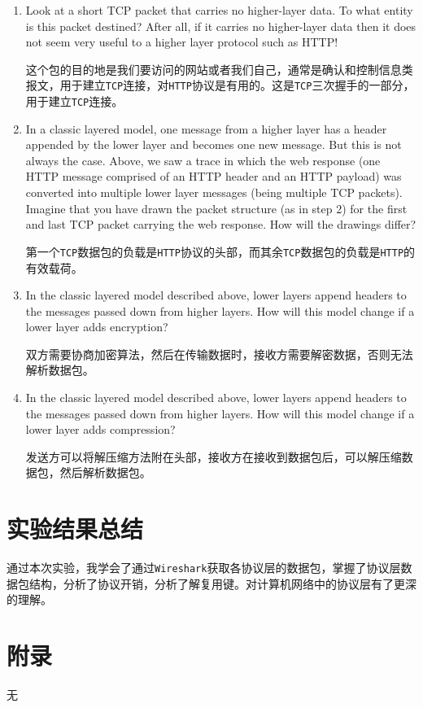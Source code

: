 \documentclass{article}
\begin{document}
\begin{enumerate}[noitemsep]
  \item Look at a short TCP packet that carries no higher-layer data. To what entity is this packet destined? After all, if it carries no higher-layer data then it does not seem very useful to a higher layer protocol such as HTTP!

        这个包的目的地是我们要访问的网站或者我们自己，通常是确认和控制信息类报文，用于建立\texttt{TCP}连接，对\texttt{HTTP}协议是有用的。这是\texttt{TCP}三次握手的一部分，用于建立\texttt{TCP}连接。

  \item In a classic layered model, one message from a higher layer has a header appended by the lower layer and becomes one new message. But this is not always the case. Above, we saw a trace in which the web response (one HTTP message comprised of an HTTP header and an HTTP payload) was converted into multiple lower layer messages (being multiple TCP packets).  Imagine that you have drawn the packet structure (as in step 2) for the first and last TCP packet carrying the web response.  How will the drawings differ?

        第一个\texttt{TCP}数据包的负载是\texttt{HTTP}协议的头部，而其余\texttt{TCP}数据包的负载是\texttt{HTTP}的有效载荷。


  \item In the classic layered model described above, lower layers append headers to the messages passed down from higher layers. How will this model change if a lower layer adds encryption?

        双方需要协商加密算法，然后在传输数据时，接收方需要解密数据，否则无法解析数据包。

  \item In the classic layered model described above, lower layers append headers to the messages passed down from higher layers. How will this model change if a lower layer adds compression?

        发送方可以将解压缩方法附在头部，接收方在接收到数据包后，可以解压缩数据包，然后解析数据包。

\end{enumerate}

\section{实验结果总结}

通过本次实验，我学会了通过\texttt{Wireshark}获取各协议层的数据包，掌握了协议层数据包结构，分析了协议开销，分析了解复用键。对计算机网络中的协议层有了更深的理解。

\section{附录}

无
\end{document}
